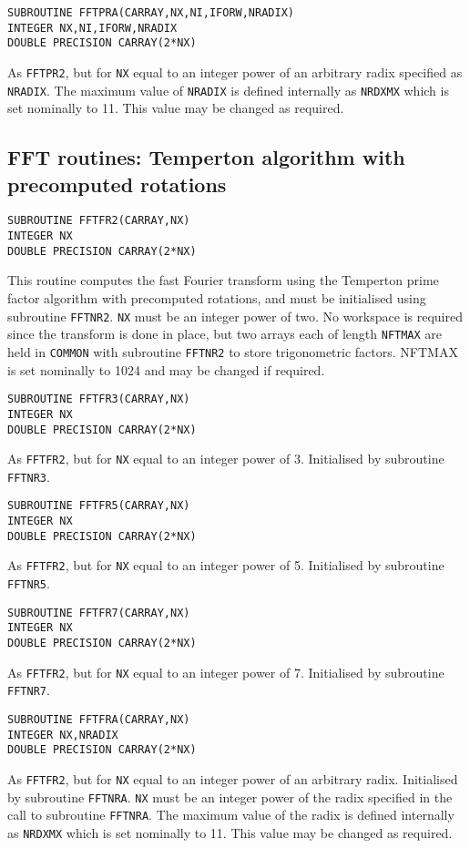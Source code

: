 \documentclass[dvips]{article}
\begin{document}
\begin{verbatim}
SUBROUTINE FFTPRA(CARRAY,NX,NI,IFORW,NRADIX)
INTEGER NX,NI,IFORW,NRADIX
DOUBLE PRECISION CARRAY(2*NX)
\end{verbatim}
As {\tt FFTPR2}, but for {\tt NX} equal to an integer power of an
arbitrary radix specified as {\tt NRADIX}.  The maximum
value of {\tt NRADIX} is defined internally as {\tt NRDXMX} which is set
nominally to 11.  This value may be changed as required.\\

\subsection*{FFT routines: Temperton algorithm with precomputed rotations}
\begin{verbatim}
SUBROUTINE FFTFR2(CARRAY,NX)
INTEGER NX
DOUBLE PRECISION CARRAY(2*NX)
\end{verbatim}
This routine computes the fast Fourier transform using the Temperton
prime factor algorithm with precomputed rotations, and must be initialised
using subroutine {\tt FFTNR2}.
{\tt NX} must be an integer power of two.  No workspace
is required since the transform is done in place, but two arrays each of
length {\tt NFTMAX} are held in {\tt COMMON} with subroutine {\tt FFTNR2} to
store trigonometric factors.
NFTMAX is set nominally to 1024 and may be changed if required.

\begin{verbatim}
SUBROUTINE FFTFR3(CARRAY,NX)
INTEGER NX
DOUBLE PRECISION CARRAY(2*NX)
\end{verbatim}
As {\tt FFTFR2}, but for {\tt NX} equal to an integer power of 3.
Initialised by subroutine {\tt FFTNR3}.\\

\begin{verbatim}
SUBROUTINE FFTFR5(CARRAY,NX)
INTEGER NX
DOUBLE PRECISION CARRAY(2*NX)
\end{verbatim}
As {\tt FFTFR2}, but for {\tt NX} equal to an integer power of 5.
Initialised by subroutine {\tt FFTNR5}.\\

\begin{verbatim}
SUBROUTINE FFTFR7(CARRAY,NX)
INTEGER NX
DOUBLE PRECISION CARRAY(2*NX)
\end{verbatim}
As {\tt FFTFR2}, but for {\tt NX} equal to an integer power of 7.
Initialised by subroutine {\tt FFTNR7}.\\

\begin{verbatim}
SUBROUTINE FFTFRA(CARRAY,NX)
INTEGER NX,NRADIX
DOUBLE PRECISION CARRAY(2*NX)
\end{verbatim}
As {\tt FFTFR2}, but for {\tt NX} equal to an integer power of an
arbitrary radix.  Initialised by subroutine {\tt FFTNRA}.
{\tt NX} must be an integer power of the radix specified in the
call to subroutine {\tt FFTNRA}.  The maximum
value of the radix is defined internally as {\tt NRDXMX} which is set
nominally to 11.  This value may be changed as required.
\end{document}
